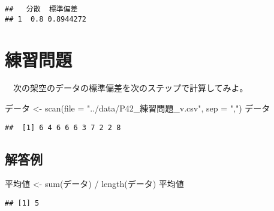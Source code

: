 \documentclass[
  12pt,
]{book}
\newenvironment{Shaded}{\begin{snugshade}}{\end{snugshade}}
\newcommand{\AttributeTok}[1]{\textcolor[rgb]{0.77,0.63,0.00}{#1}}
\newcommand{\FunctionTok}[1]{\textcolor[rgb]{0.00,0.00,0.00}{#1}}
\newcommand{\NormalTok}[1]{#1}
\newcommand{\OtherTok}[1]{\textcolor[rgb]{0.56,0.35,0.01}{#1}}
\newcommand{\SpecialCharTok}[1]{\textcolor[rgb]{0.00,0.00,0.00}{#1}}
\newcommand{\StringTok}[1]{\textcolor[rgb]{0.31,0.60,0.02}{#1}}
\begin{document}
\begin{verbatim}
##   分散  標準偏差
## 1  0.8 0.8944272
\end{verbatim}

\hypertarget{ux7df4ux7fd2ux554fux984c-2}{%
\section*{練習問題}\label{ux7df4ux7fd2ux554fux984c-2}}

　次の架空のデータの標準偏差を次のステップで計算してみよ。

\begin{Shaded}
\begin{Highlighting}[]
\StringTok{\textasciigrave{}}\AttributeTok{データ}\StringTok{\textasciigrave{}} \OtherTok{\textless{}{-}} \FunctionTok{scan}\NormalTok{(}\AttributeTok{file =} \StringTok{"../data/P42\_練習問題\_v.csv"}\NormalTok{, }\AttributeTok{sep =} \StringTok{","}\NormalTok{)}
\StringTok{\textasciigrave{}}\AttributeTok{データ}\StringTok{\textasciigrave{}}
\end{Highlighting}
\end{Shaded}

\begin{verbatim}
##  [1] 6 4 6 6 6 3 7 2 2 8
\end{verbatim}

\hypertarget{ux89e3ux7b54ux4f8b-2}{%
\subsection*{解答例}\label{ux89e3ux7b54ux4f8b-2}}

\begin{Shaded}
\begin{Highlighting}[]
\StringTok{\textasciigrave{}}\AttributeTok{平均値}\StringTok{\textasciigrave{}} \OtherTok{\textless{}{-}} \FunctionTok{sum}\NormalTok{(}\StringTok{\textasciigrave{}}\AttributeTok{データ}\StringTok{\textasciigrave{}}\NormalTok{) }\SpecialCharTok{/} \FunctionTok{length}\NormalTok{(}\StringTok{\textasciigrave{}}\AttributeTok{データ}\StringTok{\textasciigrave{}}\NormalTok{)}
\StringTok{\textasciigrave{}}\AttributeTok{平均値}\StringTok{\textasciigrave{}}
\end{Highlighting}
\end{Shaded}

\begin{verbatim}
## [1] 5
\end{verbatim}
\end{document}
